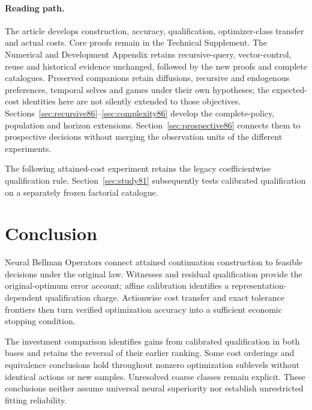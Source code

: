 \documentclass[ecta,nameyear,draft]{econsocart}
\begin{document}
\paragraph{Reading path.}
The article develops construction, accuracy, qualification, optimizer-class transfer and actual costs. Core proofs remain in the Technical Supplement. The Numerical and Development Appendix retains recursive-query, vector-control, reuse and historical evidence unchanged, followed by the new proofs and complete catalogues. Preserved companions retain diffusions, recursive and endogenous preferences, temporal selves and games under their own hypotheses; the expected-cost identities here are not silently extended to those objectives. Sections~\ref{sec:recursive86}--\ref{sec:complexity86} develop the complete-policy, population and horizon extensions. Section~\ref{sec:prospective86} connects them to prospective decisions without merging the observation units of the different experiments.

















\noindent The following attained-cost experiment retains the legacy coefficientwise qualification rule. Section~\ref{sec:study81} subsequently tests calibrated qualification on a separately frozen factorial catalogue.







\section{Conclusion}\label{sec:conclusion65}
Neural Bellman Operators connect attained continuation construction to feasible decisions under the original law. Witnesses and residual qualification provide the original-optimum error account; affine calibration identifies a representation-dependent qualification charge. Actionwise cost transfer and exact tolerance frontiers then turn verified optimization accuracy into a sufficient economic stopping condition.

The investment comparison identifies gains from calibrated qualification in both bases and retains the reversal of their earlier ranking. Some cost orderings and equivalence conclusions hold throughout nonzero optimization sublevels without identical actions or new samples. Unresolved coarse classes remain explicit. These conclusions neither assume universal neural superiority nor establish unrestricted fitting reliability.
\end{document}
